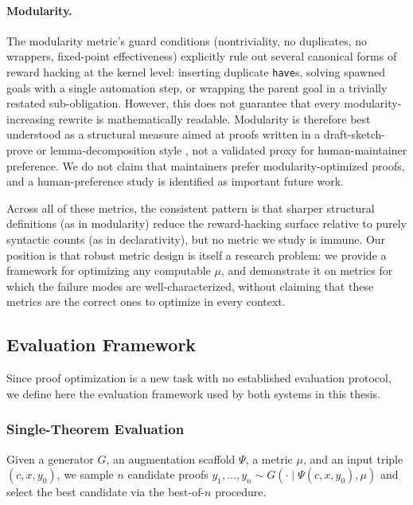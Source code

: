 \paragraph{Modularity.} The modularity metric's guard conditions (nontriviality, no duplicates, no wrappers, fixed-point effectiveness) explicitly rule out several canonical forms of reward hacking at the kernel level: inserting duplicate \texttt{have}s, solving spawned goals with a single automation step, or wrapping the parent goal in a trivially restated sub-obligation. However, this does not guarantee that every modularity-increasing rewrite is mathematically readable. Modularity is therefore best understood as a structural measure aimed at proofs written in a draft-sketch-prove or lemma-decomposition style \cite{jiang2023draft}, not a validated proxy for human-maintainer preference. We do not claim that maintainers prefer modularity-optimized proofs, and a human-preference study is identified as important future work.

Across all of these metrics, the consistent pattern is that sharper structural definitions (as in modularity) reduce the reward-hacking surface relative to purely syntactic counts (as in declarativity), but no metric we study is immune. Our position is that robust metric design is itself a research problem: we provide a framework for optimizing any computable $\mu$, and demonstrate it on metrics for which the failure modes are well-characterized, without claiming that these metrics are the correct ones to optimize in every context.

\subsection{Evaluation Framework}
\label{sec:eval_methodology}

Since proof optimization is a new task with no established evaluation protocol, we define here the evaluation framework used by both systems in this thesis.

\subsubsection{Single-Theorem Evaluation}

Given a generator $G$, an augmentation scaffold $\Psi$, a metric $\mu$, and an input triple $(c,x,y_0)$, we sample $n$ candidate proofs $y_1,\dots,y_n \sim G(\cdot \mid \Psi(c,x,y_0), \mu)$ and select the best candidate via the best-of-$n$ procedure.

